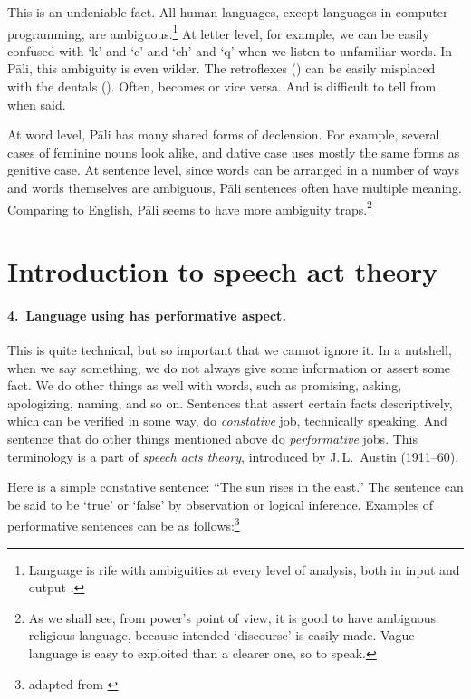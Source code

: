 This is an undeniable fact. All human languages, except languages in computer programming, are ambiguous.\footnote{Language is rife with ambiguities at every level of analysis, both in input and output \citep[p.~373]{baarsgage:cognition}.} At letter level, for example, we can be easily confused with `k' and `c' and `ch' and `q' when we listen to unfamiliar words. In P\=ali, this ambiguity is even wilder. The retroflexes () can be easily misplaced with the dentals (). Often,  becomes  or vice versa. And  is difficult to tell from  when said.

At word level, P\=ali has many shared forms of declension. For example, several cases of feminine nouns look alike, and dative case uses mostly the same forms as genitive case. At sentence level, since words can be arranged in a number of ways and words themselves are ambiguous, P\=ali sentences often have multiple meaning. Comparing to English, P\=ali seems to have more ambiguity traps.\footnote{As we shall see, from power's point of view, it is good to have ambiguous religious language, because intended `discourse' is easily made. Vague language is easy to exploited than a clearer one, so to speak.}

{}
\section*{Introduction to speech act theory}

\paragraph*{4.\ Language using has performative aspect.}

This is quite technical, but so important that we cannot ignore it. In a nutshell, when we say something, we do not always give some information or assert some fact. We do other things as well with words, such as promising, asking, apologizing, naming, and so on. Sentences that assert certain facts descriptively, which can be verified in some way, do \emph{constative} job, technically speaking. And sentence that do other things mentioned above do \emph{performative} jobs. This terminology is a part of \emph{speech acts theory}, introduced by J.\,L.\ Austin (1911--60).

Here is a simple constative sentence: ``The sun rises in the east.'' The sentence can be said to be `true' or `false' by observation or logical inference. Examples of performative sentences can be as follows:\footnote{adapted from \citealp[p.~5]{austin:how}}

